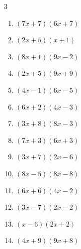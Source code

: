 \begin{multicols}{3}
\begin{enumerate}

  \item $(7x+7)(6x+7)$


  \item $(2x+5)(x+1)$


\columnbreak %

  \item $(8x+1)(9x-2)$


  \item $(2x+5)(9x+9)$


  \item $(4x-1)(6x-5)$


  \item $(6x+2)(4x-3)$


  \item $(3x+8)(8x-3)$


  \item $(7x+3)(6x+3)$


  \item $(3x+7)(2x-6)$


  \item $(8x-5)(8x-8)$


  \item $(6x+6)(4x-2)$


  \item $(3x-7)(2x-2)$


  \item $(x-6)(2x+2)$


  \item $(4x+9)(9x+8)$



\end{enumerate}
\end{multicols}
